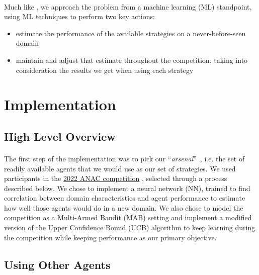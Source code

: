 \documentclass[12pt]{article}
\numberwithin{equation}{section}
\newcommand{\quotes}[1]{\textquotedblleft #1\textquotedblright \ }
\begin{document}
		\paragraph*{}
			Much like \cite{meta_agent_paper}, we approach the problem from a machine learning (ML) standpoint, using ML techniques to perform two key actions:
			\begin{itemize}
				\item estimate the performance of the available strategies on a never-before-seen domain
				\item maintain and adjust that estimate throughout the competition, taking into consideration the results we get when using each strategy
			\end{itemize}

	\section{Implementation}		\label{sec:implementation}

		\subsection{High Level Overview}	\label{sec:implementation.high_level_view}

			\paragraph*{}
				The first step of the implementation was to pick our \quotes{\emph{arsenal}}, i.e. the set of readily available agents that we would use as our set of strategies. We used participants in the \href{https://web.tuat.ac.jp/~katfuji/ANAC2022/}{2022 ANAC competition} \cite{ANAC}, selected through a process described below. We chose to implement a neural network (NN), trained to find correlation between domain characteristics and agent performance to estimate how well those agents would do in a new domain. We also chose to model the competition as a Multi-Armed Bandit (MAB) %
				setting and implement a modified version of the Upper Confidence Bound (UCB) algorithm to keep learning during the competition while keeping performance as our primary objective.



		\subsection{Using Other Agents}		\label{sec:implementation.using_other_agents}
			
\end{document}
